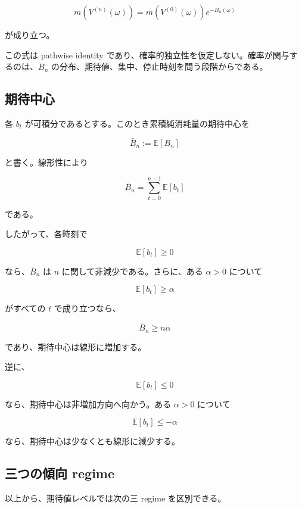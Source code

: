 \documentclass[12pt,a4paper]{article}
\begin{document}
\[
m(V^{(n)}(\omega)) = m(V^{(0)}(\omega)) e^{-B_{n}(\omega)}
\]

が成り立つ。

この式は pathwise identity であり、確率的独立性を仮定しない。確率が関与するのは、\(B_{n}\) の分布、期待値、集中、停止時刻を問う段階からである。

\subsection{期待中心}\label{ux671fux5f85ux4e2dux5fc3}

各 \(b_{t}\) が可積分であるとする。このとき累積純消耗量の期待中心を

\[
\bar B_{n} := \mathbb E[B_{n}]
\]

と書く。線形性により

\[
\bar B_{n} = \sum_{t=0}^{n-1} \mathbb E[b_{t}]
\]

である。

したがって、各時刻で

\[
\mathbb E[b_{t}] \ge 0
\]

なら、\(\bar B_{n}\) は \(n\) に関して非減少である。さらに、ある \(\alpha>0\) について

\[
\mathbb E[b_{t}] \ge \alpha
\]

がすべての \(t\) で成り立つなら、

\[
\bar B_{n} \ge n\alpha
\]

であり、期待中心は線形に増加する。

逆に、

\[
\mathbb E[b_{t}] \le 0
\]

なら、期待中心は非増加方向へ向かう。ある \(\alpha>0\) について

\[
\mathbb E[b_{t}] \le -\alpha
\]

なら、期待中心は少なくとも線形に減少する。

\subsection{三つの傾向 regime}\label{ux4e09ux3064ux306eux50beux5411-regime}

以上から、期待値レベルでは次の三 regime を区別できる。
\end{document}
